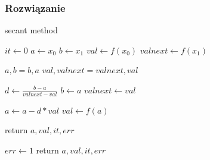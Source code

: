\documentclass{article}
\begin{document}
\subsubsection*{Rozwiązanie}
	\begin{algorithm}[H]
	\caption{secant method}
	\begin{algorithmic}
		\State $it \gets 0$
		\State $a \gets x_0$
		\State $b \gets x_1$
		\State $val \gets f(x_0)$
		\State $val next \gets f(x_1)$

				\State $a, b = b, a$
				\State $val, val next = val next, val$
			\EndIf

			\State $d \gets \frac{b - a}{val next - val}$
			\State $b \gets a$
			\State $val next \gets val$

			\State $a \gets a - d * val$
			\State $val \gets f(a)$

				\State return $a, val, it ,err$
			\EndIf
		\EndFor

		\State $err \gets 1$
		\State return $a, val, it, err$
    \end{algorithmic}
    \end{algorithm}
\end{document}
